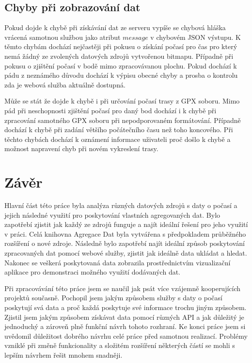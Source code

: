\documentclass[czech,bachelor,dept460,male,csharp,cpdeclaration]{diploma}
\begin{document}
	\section{Chyby při zobrazování dat}
	
	Pokud dojde k chybě při získávání dat ze serveru vypíše se chybová hláška vrácená samotnou službou jako atribut $message$ v chybovém JSON výstupu. K těmto chybám dochází nejčastěji při pokusu o získání počasí pro čas pro který nemá žádný ze zvolených datových zdrojů vytvořenou bitmapu. Případně při pokusu o zjištění počasí v bodě mimo zpracovávanou plochu. Pokud dochází k pádu z neznámého důvodu dochází k výpisu obecné chyby a prosba o kontrolu zda je webová služba aktuálně dostupná.
	
	Může se stát že dojde k chybě i při určování počasí trasy z GPX soboru. Mimo pád při neschopnosti zjištění počasí pro daný bod dochází i k chybě při zpracování samotného GPX soboru při nepodporovaném formátování. Případně dochází k chybě při zadání většího počátečního času než toho koncového. Při těchto chybách dochází k oznámení informace uživateli proč došlo k chybě a možnost napravení chyb při novém vykreslení trasy.
	
	\chapter{Závěr}
	
	Hlavní část této práce byla analýza různých datových zdrojů s daty o počasí a jejich následné využití pro poskytování vlastních agregovaných dat. Bylo zapotřebí zjistit jak každý ze zdrojů funguje a najít ideální řešení pro jeho využití v práci. Celá knihovna Agregace Dat byla vytvářena s předpokladem průběžného rozšíření o nové zdroje. Následně bylo zapotřebí najít ideální způsob poskytování zpracovaných dat pomocí webové služby, zjistit jak ideálně data ukládat a hledat. Nakonec se veškerá poskytovaná data zobrazila prostřednictvím vizualizační aplikace pro demonstraci možného využití dodávaných dat.
	
	Při zpracovávání této práce jsem se naučil jak psát více vzájemně kooperujících projektů současně. Pochopil jsem jakým způsobem služby s daty o počasí poskytují svá data a proč každá poskytuje své informace trochu jiným způsobem. Zjistil jsem jakým způsobem získávat data pomocí různých API a jak důležitý je jednoduchý a zároveň plně funkční návrh tohoto rozhraní. Ke konci práce jsem si uvědomil důležitost dobrého návrhu celé práce před samotnou realizací. Problémy vzniklé při změně funkcionality a složitém rozšíření některých částí se mohli s lepším návrhem řešit mnohem snadněji.
	
	\nocite{*}
	
	\printbibliography[title={Literatura}, heading=bibintoc]
	
	
\end{document}
